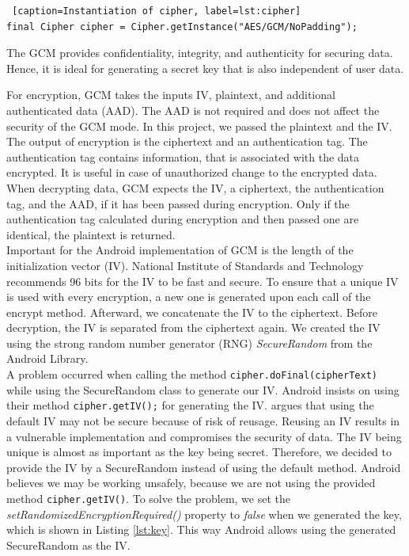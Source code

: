 \begin{lstlisting} [caption=Instantiation of cipher, label=lst:cipher]
final Cipher cipher = Cipher.getInstance("AES/GCM/NoPadding");
\end{lstlisting}


The GCM provides confidentiality, integrity, and authenticity for securing data. \cite{AESJavaAndroid} Hence, it is ideal for generating a secret key that is also independent of user data.

For encryption, GCM takes the inputs IV, plaintext, and additional authenticated data (AAD). The AAD is not required and does not affect the security of the GCM mode. \cite{AADsecure}
In this project, we passed the plaintext and the IV. The output of encryption is the ciphertext and an authentication tag. \cite{dworkin2007sp} The authentication tag contains information, that is associated with the data encrypted. It is useful in case of unauthorized change to the encrypted data. \cite{AESJavaAndroid} When decrypting data, GCM expects the IV, a ciphertext, the authentication tag, and the AAD, if it has been passed during encryption. Only if the authentication tag calculated during encryption and then passed one are identical, the plaintext is returned. \cite{dworkin2007sp} \\

Important for the Android implementation of GCM is the length of the initialization vector (IV). National Institute of Standards and Technology recommends 96 bits for the IV to be fast and secure. \cite{dworkin2007sp} To ensure that a unique IV is used with every encryption, a new one is generated upon each call of the encrypt method. Afterward, we concatenate the IV to the ciphertext. Before decryption, the IV is separated from the ciphertext again. We created the IV using the strong random number generator (RNG) \textit{SecureRandom} from the Android Library. \cite{SecureRandom} \\

A problem occurred when calling the method \texttt{cipher.doFinal(cipherText)} while using the SecureRandom class to generate our IV. 
Android insists on using their method \texttt{cipher.getIV();} for generating the IV. \cite{DefaultIV}
argues that using the default IV may not be secure because of risk of reusage. Reusing an IV results in a vulnerable implementation and compromises the security of data. The IV being unique is almost as important as the key being secret. \cite{dworkin2007sp} Therefore, we decided to provide the IV by a SecureRandom instead of using the default method. Android believes we may be working unsafely, because we are not using the provided method \texttt{cipher.getIV()}. To solve the problem, we set the \textit{setRandomizedEncryptionRequired()} property to \textit{false} when we generated the key, which is shown in Listing \ref{lst:key}. This way Android allows using the generated SecureRandom as the IV. \cite{SecretsInAndroid}

